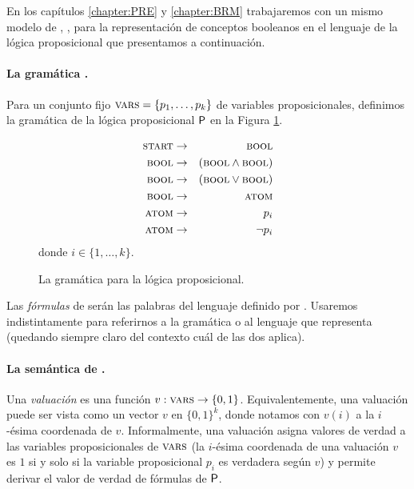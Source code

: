 
En los capítulos \ref{chapter:PRE} y \ref{chapter:BRM} trabajaremos con un mismo modelo de \lot, \grambool, para la representación de conceptos booleanos en el lenguaje de la lógica proposicional que presentamos a continuación.

\paragraph{La gramática \grambool.}
Para un conjunto fijo $\textsc{vars}=\{p_1,\dots,p_k\}$ de variables proposicionales, definimos la gramática de la lógica proposicional ${\sf P}$ en la Figura \ref{fig:grambool}.
%
\renewcommand{\thefigure}{PII.1}
\begin{figure}[h!]
\begin{eqnarray*}
\textsc{start} &\to&\textsc{bool}\\
\textsc{bool} &\to&(\textsc{bool} \wedge \textsc{bool}) \\
\textsc{bool} &\to&(\textsc{bool} \vee \textsc{bool}) \\
\textsc{bool} &\to&\textsc{atom}\\
\textsc{atom} &\to& p_i \\
\textsc{atom} &\to&\lnot p_i 
\end{eqnarray*}
donde $i\in\{1,\dots,k\}$.
\caption{La gramática \grambool para la lógica proposicional.}
\label{fig:grambool}
\end{figure}

Las {\em fórmulas} de \grambool serán las palabras del lenguaje definido por \grambool. Usaremos indistintamente \grambool para referirnos a la gramática o al lenguaje que representa (quedando siempre claro del contexto cuál de las dos aplica).


\paragraph{La semántica de \grambool.}
Una {\em valuación} es una función $v:\textsc{vars}\to\{0,1\}$. Equivalentemente, una valuación puede ser vista como un vector $v$ en $\{0,1\}^k$, donde notamos con $v(i)$ a la $i$-ésima coordenada de $v$. Informalmente, una valuación asigna valores de verdad a las variables proposicionales de $\textsc{vars}$ (la $i$-ésima coordenada de una valuación $v$ es $1$ si y solo si la variable proposicional $p_i$ es verdadera según $v$) y permite derivar el valor de verdad de fórmulas de ${\sf P}$.  

